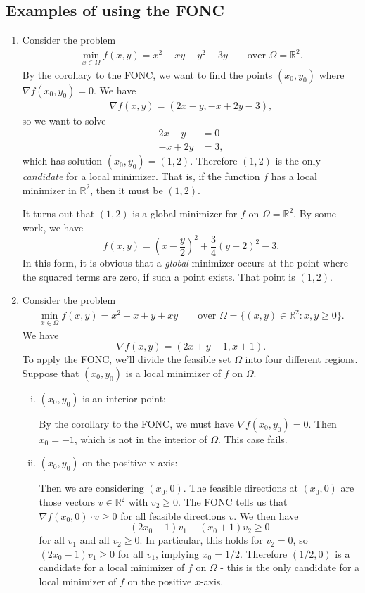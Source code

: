 \documentclass[11pt]{article}
\newcommand{\R}{\mathbb{R}}
\begin{document}
\subsection{Examples of using the FONC}
\begin{enumerate}
\item 
Consider the problem
\begin{align*}
\min_{x \in \Omega} f(x,y) = x^2 - xy + y^2 - 3y \qquad \text{over } \Omega = \R^2.
\end{align*}
By the corollary to the FONC, we want to find the points $(x_0, y_0)$ where $\nabla f(x_0, y_0) = 0$. We have
\begin{align*}
\nabla f(x,y) = (2x-y, -x+2y-3),
\end{align*}
so we want to solve 
\begin{align*}
2x - y &= 0 \\
-x + 2y &= 3,
\end{align*}
which has solution $(x_0, y_0) = (1,2)$. Therefore $(1,2)$ is the only \emph{candidate} for a local minimizer. That is, if the function $f$ has a local minimizer in $\R^2$, then it must be $(1,2)$.

It turns out that $(1,2)$ is a global minimizer for $f$ on $\Omega = \R^2$. By some work, we have
\[
f(x,y) = \left(x - \frac{y}{2}\right)^2 + \frac{3}{4}(y-2)^2 - 3.
\]
In this form, it is obvious that a \emph{global} minimizer occurs at the point where the squared terms are zero, if such a point exists. That point is $(1,2)$.

\item
Consider the problem
\begin{align*}
\min_{x \in \Omega} f(x,y) = x^2 - x + y + xy \qquad \text{over } \Omega = \{(x,y) \in \R^2 : x,y \geq 0\}.
\end{align*}
We have
\[
\nabla f(x,y) = (2x + y - 1, x + 1).
\]
To apply the FONC, we'll divide the feasible set $\Omega$ into four different regions. Suppose that $(x_0, y_0)$ is a local minimizer of $f$ on $\Omega$.
\begin{enumerate}[(i)]
\item $(x_0, y_0)$ is an interior point: 

By the corollary to the FONC, we must have $\nabla f(x_0, y_0) = 0$. Then $x_0 = -1$, which is not in the interior of $\Omega$. This case fails.

\item $(x_0, y_0)$ on the positive x-axis: 

Then we are considering $(x_0, 0)$. The feasible directions at $(x_0, 0)$ are those vectors $v \in \R^2$ with $v_2 \geq 0$. The FONC tells us that $\nabla f(x_0,0) \cdot v \geq 0$ for all feasible directions $v$. We then have
\[
(2x_0 - 1)v_1 + (x_0 + 1)v_2 \geq 0
\]
for all $v_1$ and all $v_2 \geq 0$. In particular, this holds for $v_2 = 0$, so $(2x_0 - 1)v_1 \geq 0$ for all $v_1$, implying $x_0 = 1/2$. Therefore $(1/2, 0)$ is a candidate for a local minimizer of $f$ on $\Omega$ - this is the only candidate for a local minimizer of $f$ on the positive $x$-axis.


\end{enumerate}
\end{enumerate}
\end{document}
